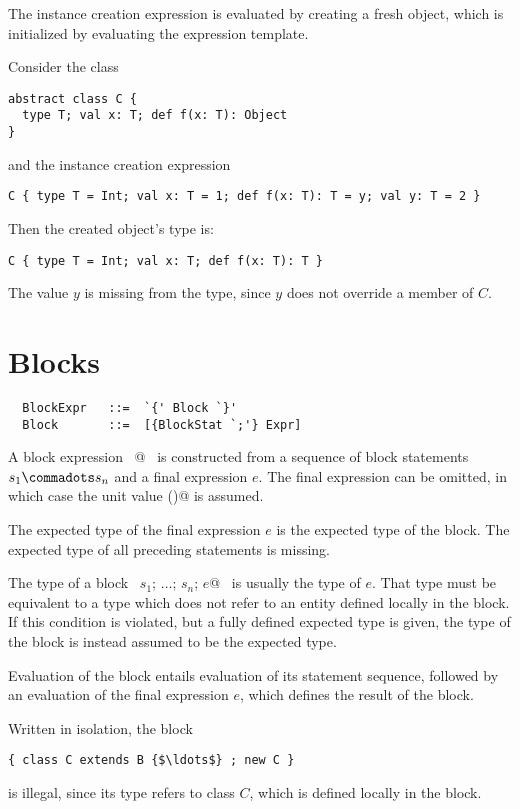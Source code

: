 \documentclass[a4paper,12pt,twoside,titlepage]{book}
\begin{document}
The instance creation expression is evaluated by creating a fresh
object, which is initialized by evaluating the expression template.

\example Consider the class
\begin{lstlisting}
abstract class C {
  type T; val x: T; def f(x: T): Object
}
\end{lstlisting}
and the instance creation expression
\begin{lstlisting}
C { type T = Int; val x: T = 1; def f(x: T): T = y; val y: T = 2 }
\end{lstlisting}
Then the created object's type is:
\begin{lstlisting}
C { type T = Int; val x: T; def f(x: T): T }
\end{lstlisting}
The value $y$ is missing from the type, since $y$ does not
override a member of $C$.

\section{Blocks}
\label{sec:blocks}

\syntax\begin{lstlisting}
  BlockExpr   ::=  `{' Block `}'
  Block       ::=  [{BlockStat `;'} Expr]
\end{lstlisting}

A block expression ~@~ is constructed from a
sequence of block statements $s_1 \commadots s_n$ and a final
expression $e$. The final expression can be omitted, in which
case the unit value \lstinline@()@ is assumed.


The expected type of the final expression $e$ is the expected
type of the block. The expected type of all preceding statements is
missing.

The type of a block ~\lstinline@$s_1$; $\ldots$; $s_n$; $e$@~ is usually the type of
$e$.  That type must be equivalent to a type which does not refer
to an entity defined locally in the block. If this condition is
violated, but a fully defined expected type is given, the type of the
block is instead assumed to be the expected type.

Evaluation of the block entails evaluation of its statement sequence,
followed by an evaluation of the final expression $e$, which
defines the result of the block.

\example
Written in isolation, 
the block 
\begin{lstlisting}
{ class C extends B {$\ldots$} ; new C }
\end{lstlisting}
is illegal, since its type
refers to class $C$, which is defined locally in the block.
\end{document}
